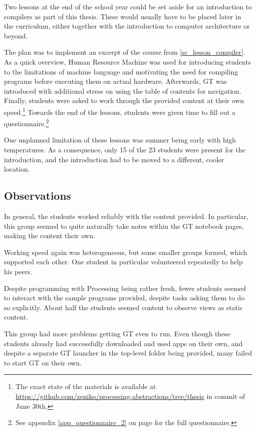 Two lessons at the end of the school year could be set aside for an introduction to compilers as part of this thesis. These would usually have to be placed later in the curriculum, either together with the introduction to computer architecture or beyond.

The plan was to implement an excerpt of the course from \ref{sc_lesson_compiler}. As a quick overview, Human Resource Machine was used for introducing students to the limitations of machine language and motivating the need for compiling programs before executing them on actual hardware. Afterwards, \ac{GT} was introduced with additional stress on using the table of contents for navigation. Finally, students were asked to work through the provided content at their own speed.\footnote{The exact state of the materials is available at \url{https://github.com/zeniko/processing-abstractions/tree/thesis} in commit  of June 30th.} Towards the end of the lessons, students were given time to fill out a questionnaire.\footnote{See appendix \ref{app_questionnaire_2} on page \pageref{app_questionnaire_2} for the full questionnaire.}

One unplanned limitation of these lessons was summer being early with high temperatures. As a consequence, only 15 of the 23 students were present for the introduction, and the introduction had to be moved to a different, cooler location.


\subsection{Observations}

In general, the students worked reliably with the content provided. In particular, this group seemed to quite naturally take notes within the \ac{GT} notebook pages, making the content their own.

Working speed again was heterogeneous, but some smaller groups formed, which supported each other. One student in particular volunteered repeatedly to help his peers.

Despite programming with Processing being rather fresh, fewer students seemed to interact with the sample programs provided, despite tasks asking them to do so explicitly. About half the students seemed content to observe views as static content.

This group had more problems getting \ac{GT} even to run. Even though these students already had successfully downloaded and used apps on their own, and despite a separate \ac{GT} launcher in the top-level folder being provided, many failed to start \ac{GT} on their own.

